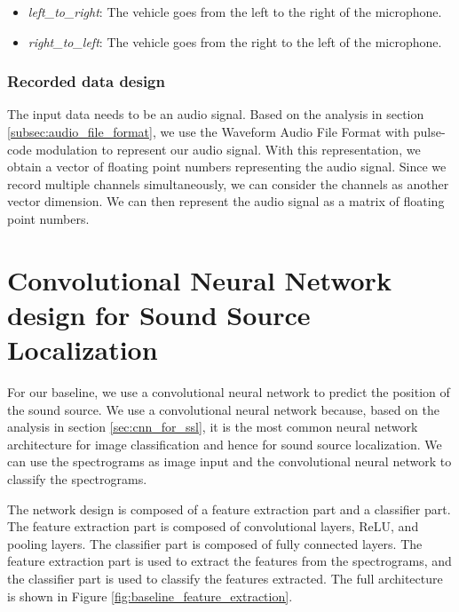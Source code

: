 \begin{itemize}
    \item  \textit{left\_to\_right}:  The vehicle goes from the left to the right of the microphone.
    \item  \textit{right\_to\_left}:  The vehicle goes from the right to the left of the microphone.
\end{itemize}

\subsubsection{Recorded data design}

The input data needs to be an audio signal. Based on the analysis in section \ref{subsec:audio_file_format}, we use the Waveform Audio File Format with pulse-code modulation to represent our audio signal. With this representation, we obtain a vector of floating point numbers representing the audio signal. Since we record multiple channels simultaneously, we can consider the channels as another vector dimension. We can then represent the audio signal as a matrix of floating point numbers.

\section{Convolutional Neural Network design for Sound Source Localization}
\label{sec:cnn_design_for_ssl}

For our baseline, we use a convolutional neural network to predict the position of the sound source. We use a convolutional neural network because, based on the analysis in section \ref{sec:cnn_for_ssl}, it is the most common neural network architecture for image classification and hence for sound source localization. We can use the spectrograms as image input and the convolutional neural network to classify the spectrograms.

The network design is composed of a feature extraction part and a classifier part. The feature extraction part is composed of convolutional layers, ReLU, and pooling layers. The classifier part is composed of fully connected layers. The feature extraction part is used to extract the features from the spectrograms, and the classifier part is used to classify the features extracted. The full architecture is shown in Figure \ref{fig:baseline_feature_extraction}.

